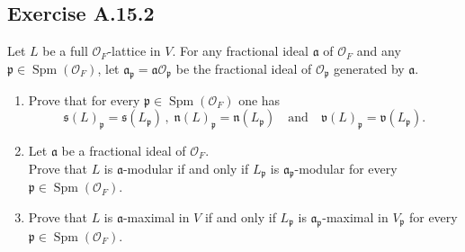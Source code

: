 \documentclass[12pt, a4paper]{article}
\begin{document}
\subsection*{Exercise A.15.2}
Let $L$ be a full $\mathcal{O}_F$-lattice in $V$. For any fractional ideal $\mathfrak{a}$ of $\mathcal{O}_F$ and any $\mathfrak{p} \in \operatorname{Spm}(\mathcal{O}_F)$, let $\mathfrak{a}_{\mathfrak{p}} = \mathfrak{a}\mathcal{O}_{\mathfrak{p}}$ be the fractional ideal of $\mathcal{O}_{\mathfrak{p}}$ generated by $\mathfrak{a}$.
\begin{enumerate}
    \item Prove that for every $\mathfrak{p} \in \operatorname{Spm}(\mathcal{O}_F)$ one has
    \[ \mathfrak{s}(L)_{\mathfrak{p}} = \mathfrak{s}(L_{\mathfrak{p}}) \,,\; \mathfrak{n}(L)_{\mathfrak{p}} = \mathfrak{n}(L_{\mathfrak{p}}) \quad \text{and} \quad \mathfrak{v}(L)_{\mathfrak{p}} = \mathfrak{v}(L_{\mathfrak{p}}) . \]
    \item Let $\mathfrak{a}$ be a fractional ideal of $\mathcal{O}_F$. \\
    Prove that $L$ is $\mathfrak{a}$-modular if and only if $L_{\mathfrak{p}}$ is $\mathfrak{a}_{\mathfrak{p}}$-modular for every $\mathfrak{p} \in \operatorname{Spm}(\mathcal{O}_F)$.
    \item Prove that $L$ is $\mathfrak{a}$-maximal in $V$ if and only if $L_{\mathfrak{p}}$ is $\mathfrak{a}_{\mathfrak{p}}$-maximal in $V_{\mathfrak{p}}$ for every $\mathfrak{p} \in \operatorname{Spm}(\mathcal{O}_F)$.
\end{enumerate}
\end{document}
